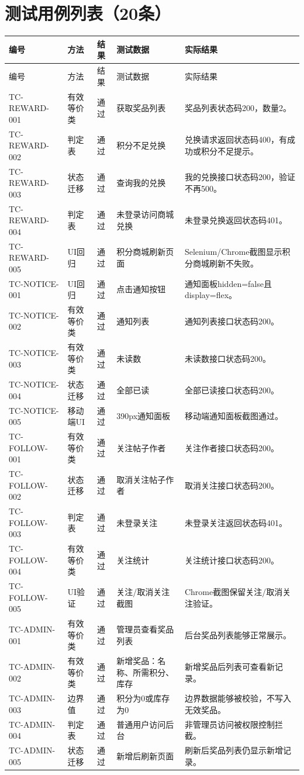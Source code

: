 \documentclass[bwprint]{report}
\begin{document}
\section{测试用例列表（20条）}
{\footnotesize
\setlength{\tabcolsep}{3pt}
\begin{longtable}{P{2.0cm}P{2.0cm}P{1cm}P{3.7cm}P{5.4cm}}
\toprule
编号 & 方法 & 结果 & 测试数据 & 实际结果\\
\midrule
\endfirsthead
\toprule
编号 & 方法 & 结果 & 测试数据 & 实际结果\\
\midrule
\endhead
TC-REWARD-001 & 有效等价类 & 通过 & 获取奖品列表 & 奖品列表状态码200，数量2。 \\
TC-REWARD-002 & 判定表 & 通过 & 积分不足兑换 & 兑换请求返回状态码400，有成功或积分不足提示。 \\
TC-REWARD-003 & 状态迁移 & 通过 & 查询我的兑换 & 我的兑换接口状态码200，验证不再500。 \\
TC-REWARD-004 & 判定表 & 通过 & 未登录访问商城兑换 & 未登录兑换返回状态码401。 \\
TC-REWARD-005 & UI回归 & 通过 & 积分商城刷新页面 & Selenium/Chrome截图显示积分商城刷新不失败。 \\
TC-NOTICE-001 & UI回归 & 通过 & 点击通知按钮 & 通知面板hidden=false且display=flex。 \\
TC-NOTICE-002 & 有效等价类 & 通过 & 通知列表 & 通知列表接口状态码200。 \\
TC-NOTICE-003 & 有效等价类 & 通过 & 未读数 & 未读数接口状态码200。 \\
TC-NOTICE-004 & 状态迁移 & 通过 & 全部已读 & 全部已读接口状态码200。 \\
TC-NOTICE-005 & 移动端UI & 通过 & 390px通知面板 & 移动端通知面板截图通过。 \\
TC-FOLLOW-001 & 有效等价类 & 通过 & 关注帖子作者 & 关注作者接口状态码200。 \\
TC-FOLLOW-002 & 状态迁移 & 通过 & 取消关注帖子作者 & 取消关注接口状态码200。 \\
TC-FOLLOW-003 & 判定表 & 通过 & 未登录关注 & 未登录关注返回状态码401。 \\
TC-FOLLOW-004 & 有效等价类 & 通过 & 关注统计 & 关注统计接口状态码200。 \\
TC-FOLLOW-005 & UI验证 & 通过 & 关注/取消关注截图 & Chrome截图保留关注/取消关注验证。 \\
TC-ADMIN-001 & 有效等价类 & 通过 & 管理员查看奖品列表 & 后台奖品列表能够正常展示。 \\
TC-ADMIN-002 & 有效等价类 & 通过 & 新增奖品：名称、所需积分、库存 & 新增奖品后列表可查看新记录。 \\
TC-ADMIN-003 & 边界值 & 通过 & 积分为0或库存为0 & 边界数据能够被校验，不写入无效奖品。 \\
TC-ADMIN-004 & 判定表 & 通过 & 普通用户访问后台 & 非管理员访问被权限控制拦截。 \\
TC-ADMIN-005 & 状态迁移 & 通过 & 新增后刷新页面 & 刷新后奖品列表仍显示新增记录。 \\
\bottomrule
\end{longtable}
}
\end{document}
